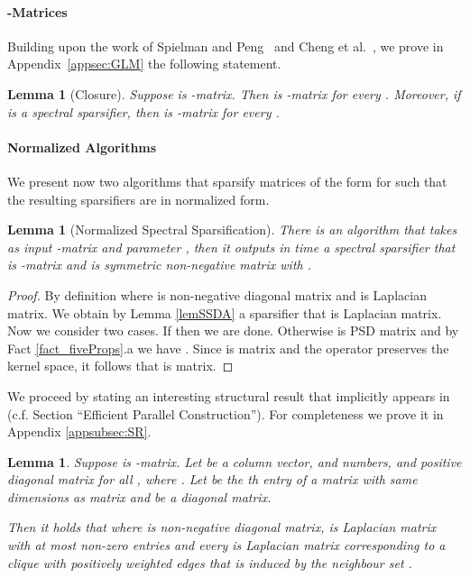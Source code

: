 \documentclass[11pt]{article}
\newcommand{\mylemma}[2]{\begin{lem}\label{lem:#1}#2\end{lem}}
\newtheorem{lem}[thm]{Lemma}
\numberwithin{thm}{section}
\begin{document}
\paragraph*{-Matrices}
Building upon the work of Spielman and Peng~\cite[Proposition 5.6]{PS14} and Cheng et al.~\cite[Proposition 25]{CCLPT15}, we prove in Appendix~\ref{appsec:GLM} the following statement.

\begin{lem}[Closure]\label{lem_Closure}
Suppose  is -matrix. Then  is -matrix for every . Moreover, if  is a spectral sparsifier, then  is -matrix for every .
\end{lem}

\paragraph*{Normalized Algorithms} We present now two algorithms that sparsify matrices of the form  for  such that the resulting sparsifiers are in normalized form.


\begin{lem}[Normalized Spectral Sparsification]\label{lem_SS_GL}
There is an algorithm 
that takes as input -matrix  and parameter
, then it outputs in 
time a spectral sparsifier  that is -matrix and 
is symmetric non-negative matrix with .
\end{lem}

\begin{proof}
By definition  where  is non-negative diagonal matrix and  is Laplacian matrix. We obtain by Lemma \ref{lemSSDA} a sparsifier  that is Laplacian matrix. Now we consider two cases. If  then we are done. Otherwise  is PSD matrix and by Fact \ref{fact_fiveProps}.a we have . Since  is  matrix and the operator  preserves the kernel space, it follows that  is  matrix.
\end{proof}


We proceed by stating an interesting structural result that implicitly appears in~\cite{PS14} (c.f. Section ``Efficient
Parallel Construction''). For completeness we prove it in Appendix \ref{appsubsec:SR}.


\newcommand{\lemGLStruct}
{
Suppose  is -matrix. Let
 be a column vector,
 and 
numbers, and 
positive diagonal matrix for all , where . Let  be the th entry of a matrix with same dimensions as matrix  and  be a diagonal matrix.

Then it holds that
 where  is non-negative diagonal matrix,  is Laplacian matrix with
at most  non-zero entries and every  is Laplacian matrix corresponding to a clique with positively weighted edges that is induced by the neighbour set .
}
\mylemma{lemGLStruct}{\lemGLStruct}
\end{document}
